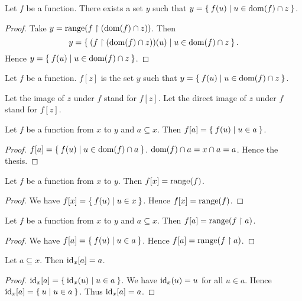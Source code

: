 \documentclass[../../set-theory.tex]{subfiles}
\begin{document}
  \begin{forthel}
    \begin{lemma}
      Let $f$ be a function.
      There exists a set $y$ such that $y = \Set{f(u) | u \in \operatorname{dom}(f) \cap z}$.
    \end{lemma}
    \begin{proof}
      Take $y = \operatorname{range}(f \upharpoonright (\operatorname{dom}(f) \cap z))$.
      Then \[ y = \Set{(f \upharpoonright(\operatorname{dom}(f) \cap z))(u) | u \in \operatorname{dom}(f) \cap z}. \]
      Hence $y = \Set{f(u) | u \in \operatorname{dom}(f) \cap z}$.
    \end{proof}

    \begin{definition}
      Let $f$ be a function.
      $f[z]$ is the set $y$ such that $y = \Set{f(u) | u \in \operatorname{dom}(f) \cap z}$.
    \end{definition}

    Let the image of $z$ under $f$ stand for $f[z]$.
    Let the direct image of $z$ under $f$ stand for $f[z]$.

    \begin{proposition}\label{SetTheory_02_02_549225}
      Let $f$ be a function from $x$ to $y$ and $a \subseteq x$.
      Then $f[a] = \Set{f(u) | u \in a}$.
    \end{proposition}
    \begin{proof}
      $f[a] = \Set{f(u) | u \in \operatorname{dom}(f) \cap a}$.
      $\operatorname{dom}(f) \cap a = x \cap a = a$.
      Hence the thesis.
    \end{proof}

    \begin{corollary}\label{SetTheory_02_02_516307}
      Let $f$ be a function from $x$ to $y$.
      Then $f[x] = \operatorname{range}(f)$.
    \end{corollary}
    \begin{proof}
      We have $f[x] = \Set{f(u) | u \in x}$.
      Hence $f[x] = \operatorname{range}(f)$.
    \end{proof}

    \begin{corollary}\label{SetTheory_02_02_216993}
      Let $f$ be a function from $x$ to $y$ and $a \subseteq x$.
      Then $f[a] = \operatorname{range}(f \upharpoonright a)$.
    \end{corollary}
    \begin{proof}
      We have $f[a] = \Set{f(u) | u \in a}$.
      Hence $f[a] = \operatorname{range}(f \upharpoonright a)$.
    \end{proof}

    \begin{proposition}\label{SetTheory_02_02_560324}
      Let $a \subseteq x$.
      Then $\operatorname{id}_{x}[a] = a$.
    \end{proposition}
    \begin{proof}
      $\operatorname{id}_{x}[a] = \Set{\operatorname{id}_{x}(u) | u \in a}$.
      We have $\operatorname{id}_{x}(u) = u$ for all $u \in a$.
      Hence $\operatorname{id}_{x}[a] = \Set{u | u \in a}$.
      Thus $\operatorname{id}_{x}[a] = a$.
    \end{proof}


\end{forthel}
\end{document}
